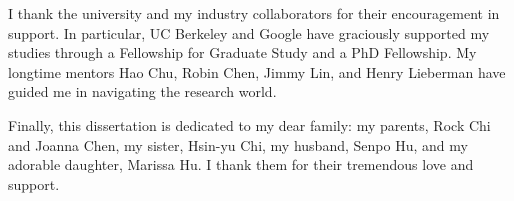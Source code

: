 \begin{acknowledgements}
I thank the university and my industry collaborators for their encouragement in support. In particular, UC Berkeley and Google have graciously supported my studies through a Fellowship for Graduate Study and a PhD Fellowship. My longtime mentors Hao Chu, Robin Chen, Jimmy Lin, and Henry Lieberman have guided me in navigating the research world.

Finally, this dissertation is dedicated to my dear family: my parents, Rock Chi and Joanna Chen, my sister, Hsin-yu Chi, my husband, Senpo Hu, and my adorable daughter, Marissa Hu. I thank them for their tremendous love and support.

\end{acknowledgements}
